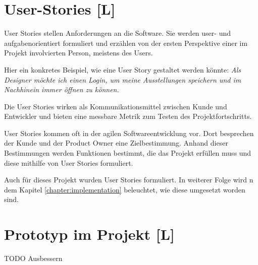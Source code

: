 \section{User-Stories [L]}
\label{ch:user-stories}
User Stories stellen Anforderungen an die Software. Sie werden user- und aufgabenorientiert formuliert und erzählen von der ersten Perspektive einer im Projekt involvierten Person, meistens des Users. \cite{AgileVorgehensmodelle}
 
Hier ein konkretes Beispiel, wie eine User Story gestaltet werden könnte: 
\emph{Als Designer möchte ich einen Login, um meine Ausstellungen speichern und im Nachhinein immer öffnen zu können.}

Die User Stories wirken als Kommunikationsmittel zwischen Kunde und Entwickler und bieten eine messbare Metrik zum Testen des Projektfortschritts. \cite{AgileVorgehensmodelle}

User Stories kommen oft in der agilen Softwareentwicklung vor. Dort besprechen der Kunde und der Product Owner eine Zielbestimmung. Anhand dieser Bestimmungen werden Funktionen bestimmt, die das Projekt erfüllen muss und diese mithilfe von User Stories formuliert. \cite{AgileVorgehensmodelle}

Auch für dieses Projekt wurden User Stories formuliert.
In weiterer Folge wird n dem Kapitel \ref{chapter:implementation} beleuchtet, wie diese umgesetzt worden sind.



\section{Prototyp im Projekt [L]}
TODO Ausbessern

